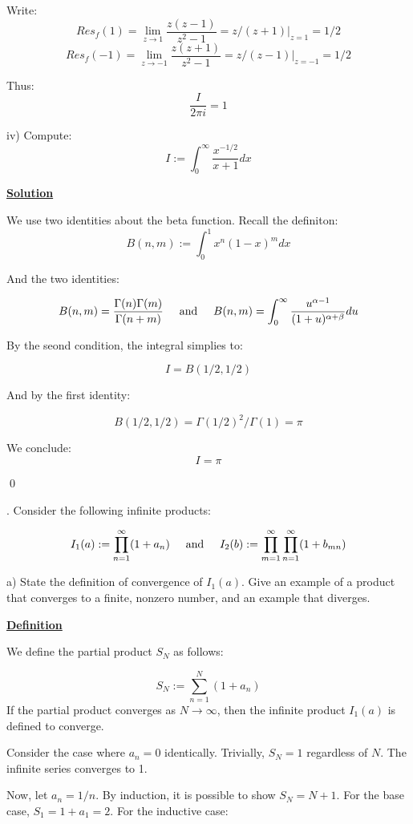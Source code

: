 \documentclass{article}
\newcommand{\new}[1]{
    \vspace{2mm}
    \noindent
    \textbf{
    \underline{#1}}
}
\newcounter{problemcnt}
\newcommand{\Problem}{{
    \vspace{5mm}
    \stepcounter{problemcnt}
    \noindent
    \arabic{problemcnt}. 
}
}
\newcommand{\textAnd}{
    {
        \hspace{5mm}
        \textrm{and}
        \hspace{5mm}
    }
}
\begin{document}
Write:
\[
    Res_f(1) = \lim_{z \rightarrow 1} 
    \frac{z(z - 1)}{z^2 - 1}
    = z/(z+1)\bigg|_{z = 1} = 1/2
\]
\[
    Res_f(-1) = \lim_{z \rightarrow -1} 
    \frac{z(z + 1)}{z^2 - 1}
    = z/(z-1)\bigg|_{z = -1} = 1/2
\]

Thus:
\[
    \boxed{
    \frac{I}{2\pi i} = 1
    }
\]




\newpage

iv) Compute:
\[
    I:=
    \int_0^\infty {
        \frac{x^{-1/2}}
        {x+1}
        dx
    }
\]
\new{Solution}
We use two identities about the beta function. Recall
the definiton:
\[
    B(n, m) := \int_0^1 x^n(1-x)^mdx
\]

And the two identities:

\[
    B(n, m) = \frac{\Gamma(n)\Gamma(m)}{\Gamma(n+m)}
    \textAnd 
    B(n, m) = \int_0^\infty 
    \frac{u^{\alpha - 1}}{(1+u)^{\alpha + \beta}} du
\]

By the seond condition, the integral simplies to:

\[
    I = B(1/2, 1/2)
\]

And by the first identity:

\[
    B(1/2, 1/2) = \Gamma(1/2)^2/\Gamma(1) = \pi
\]

We conclude:
\[
    I = \pi
\]

\qed

\newpage

\Problem Consider the following infinite products:

\[
    I_1(a) := \prod_{n = 1}^\infty (1+a_n)
    \textAnd 
    I_2(b) := \prod_{m = 1}^\infty 
    \prod_{n = 1}^\infty(1 + b_{mn})
\]

a) State the definition of convergence of $I_1(a)$. 
Give an example of a product that converges to 
a finite, nonzero number, and an example that diverges. 

\new{Definition} 
We define the partial product $S_N$ as follows:

\[
    S_N := \sum_{n = 1}^N (1+a_n)
\]
If the partial product converges as $N \rightarrow \infty$, 
then the infinite product $I_1(a)$ is defined to converge. 

Consider the case where $a_n = 0$ identically. Trivially, 
$S_N = 1$ regardless of $N$. The infinite series converges 
to 1. 

Now, let $a_n = 1/n$. By induction, it is possible to 
show $S_N = N + 1$. For the base case, $S_1 = 1 + a_1 = 2$. 
For the inductive case:
\end{document}
